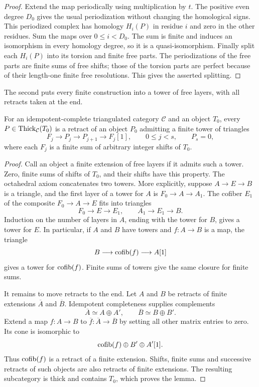 \begin{proof}
Extend the map periodically using multiplication by $t$.
The positive even degree $D_0$ gives the usual periodization
without changing the homological signs.  This periodized complex
has homology $H_i(P)$ in residue $i$ and zero in the other residues.
Sum the maps over $0\leq i<D_0$.  The sum is finite and induces
an isomorphism in every homology degree, so it is a
quasi-isomorphism.  Finally split each $H_i(P)$ into its torsion
and finite free parts.  The periodizations of the free parts are
finite sums of free shifts; those of the torsion parts are perfect
because of their length-one finite free resolutions.  This gives
the asserted splitting.
\end{proof}

The second puts every finite construction into a tower of free
layers, with all retracts taken at the end.

\begin{lemma}
\label{rew:obs:tower-normal-form}
For an idempotent-complete triangulated category $\mathcal C$ and
an object $T_0$, every $P\in\operatorname{Thick}_{\mathcal C}(T_0)$ is a
retract of an object $P_0$ admitting a finite tower of triangles
\[
 F_j\longrightarrow P_j\longrightarrow P_{j+1}
      \longrightarrow F_j[1],
 \qquad 0\leq j<s,\qquad P_s=0,
\]
where each $F_j$ is a finite sum of arbitrary integer shifts of
$T_0$.
\end{lemma}

\begin{proof}
Call an object a finite extension of free layers if it admits such
a tower.  Zero, finite sums of shifts of $T_0$, and their shifts
have this property.  The octahedral axiom concatenates two towers.
More explicitly, suppose $A\to E\to B$ is a triangle, and the
first layer of a tower for $A$ is $F_0\to A\to A_1$.  The cofiber
$E_1$ of the composite $F_0\to A\to E$ fits into triangles
\[
 F_0\longrightarrow E\longrightarrow E_1,
 \qquad A_1\longrightarrow E_1\longrightarrow B.
\]
Induction on the number of layers in $A$, ending with the tower
for $B$, gives a tower for $E$.  In particular, if $A$ and $B$
have towers and $f:A\to B$ is a map, the triangle
\[
 B\longrightarrow\operatorname{cofib}(f)\longrightarrow A[1]
\]
gives a tower for $\operatorname{cofib}(f)$.  Finite sums of towers give the
same closure for finite sums.

It remains to move retracts to the end.  Let $A$ and $B$ be
retracts of finite extensions $\overline A$ and $\overline B$.
Idempotent completeness supplies complements
\[
 \overline A\simeq A\oplus A',
 \qquad \overline B\simeq B\oplus B'.
\]
Extend a map $f:A\to B$ to
$\overline f:\overline A\to\overline B$ by setting all other
matrix entries to zero.  Its cone is isomorphic to
\[
 \operatorname{cofib}(f)\oplus B'\oplus A'[1].
\]
Thus $\operatorname{cofib}(f)$ is a retract of a finite extension.  Shifts,
finite sums and successive retracts of such objects are also
retracts of finite extensions.  The resulting subcategory is thick
and contains $T_0$, which proves the lemma.
\end{proof}

